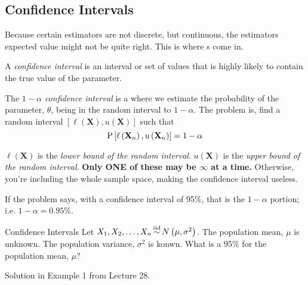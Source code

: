 	\subsection{Confidence Intervals} \label{subsec:Confidence Interval}
	Because certain estimators are not discrete, but continuous, the estimators expected value might not be quite right.
	This is where s come in.
		\begin{definition} \label{def:Confidence Interval}
			A \emph{confidence interval} is an interval or set of values that is highly likely to contain the true value of the parameter.
		\end{definition}
		\begin{definition} \label{def:1-alpha Confidence Interval}
			The \emph{$1-\alpha$ confidence interval} is a  where we estimate the probability of the parameter, $\theta$, being in the random interval to $1-\alpha$.
			The problem is, find a random interval $\left[ \ell \left( \mathbf{X} \right), u \left( \mathbf{X} \right) \right]$ such that
			\begin{equation} \label{eq:1-alpha Confidence Interval}
				\operatorname{\operatorname{P}} \left[ \ell \left( \mathbf{X}_{n} \right) , u \left( \mathbf{X}_{n} \right) \right] = 1-\alpha
			\end{equation}
			\begin{remark}
				$\ell \left( \mathbf{X} \right)$ is the \emph{lower bound of the random interval}.
				$u \left( \mathbf{X} \right)$ is the \emph{upper bound of the random interval}.
				\textbf{Only ONE of these may be $\infty$ at a time.} Otherwise, you're including the whole sample space, making the confidence interval useless.
			\end{remark}
			\begin{remark}
				If the problem says, with a confidence interval of 95\%, that is the $1-\alpha$ portion; i.e. $1-\alpha = 0.95 \%$.
			\end{remark}
		\end{definition}
		\begin{example}{Confidence Intervals}
                  Let $X_{1}, X_{2}, \ldots, X_{n} \operatorname{\overset{\text{iid}}{\operatorname{\sim}}} N \left( \mu, \sigma^{2} \right)$.
                  The population mean, $\mu$ is unknown.
                  The population variance, $\sigma^{2}$ is konwn.
                  What is a 95\%  for the population mean, $\mu$?

                  \tcblower

                  Solution in Example 1 from Lecture 28.
		\end{example}
	
